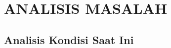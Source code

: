 %
%
%
%
%
\cleardoublepage
\chapter{ANALISIS MASALAH}
\label{chap:analisis-masalah}

\section{Analisis Kondisi Saat Ini}

